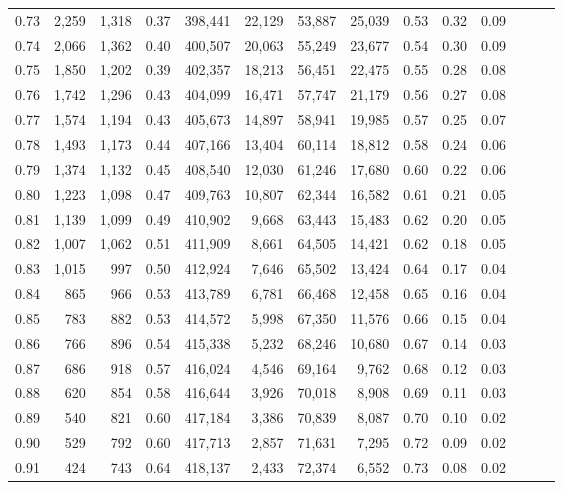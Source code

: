 \begin{tabular}{rrrrrrrrrrrrrr}
0.73 &  2,259 &  1,318 &  0.37 &  398,441 &   22,129 &  53,887 &  25,039 &  0.53 &  0.32 &      0.09 \\
0.74 &  2,066 &  1,362 &  0.40 &  400,507 &   20,063 &  55,249 &  23,677 &  0.54 &  0.30 &      0.09 \\
0.75 &  1,850 &  1,202 &  0.39 &  402,357 &   18,213 &  56,451 &  22,475 &  0.55 &  0.28 &      0.08 \\
0.76 &  1,742 &  1,296 &  0.43 &  404,099 &   16,471 &  57,747 &  21,179 &  0.56 &  0.27 &      0.08 \\
0.77 &  1,574 &  1,194 &  0.43 &  405,673 &   14,897 &  58,941 &  19,985 &  0.57 &  0.25 &      0.07 \\
0.78 &  1,493 &  1,173 &  0.44 &  407,166 &   13,404 &  60,114 &  18,812 &  0.58 &  0.24 &      0.06 \\
0.79 &  1,374 &  1,132 &  0.45 &  408,540 &   12,030 &  61,246 &  17,680 &  0.60 &  0.22 &      0.06 \\
0.80 &  1,223 &  1,098 &  0.47 &  409,763 &   10,807 &  62,344 &  16,582 &  0.61 &  0.21 &      0.05 \\
0.81 &  1,139 &  1,099 &  0.49 &  410,902 &    9,668 &  63,443 &  15,483 &  0.62 &  0.20 &      0.05 \\
0.82 &  1,007 &  1,062 &  0.51 &  411,909 &    8,661 &  64,505 &  14,421 &  0.62 &  0.18 &      0.05 \\
0.83 &  1,015 &    997 &  0.50 &  412,924 &    7,646 &  65,502 &  13,424 &  0.64 &  0.17 &      0.04 \\
0.84 &    865 &    966 &  0.53 &  413,789 &    6,781 &  66,468 &  12,458 &  0.65 &  0.16 &      0.04 \\
0.85 &    783 &    882 &  0.53 &  414,572 &    5,998 &  67,350 &  11,576 &  0.66 &  0.15 &      0.04 \\
0.86 &    766 &    896 &  0.54 &  415,338 &    5,232 &  68,246 &  10,680 &  0.67 &  0.14 &      0.03 \\
0.87 &    686 &    918 &  0.57 &  416,024 &    4,546 &  69,164 &   9,762 &  0.68 &  0.12 &      0.03 \\
0.88 &    620 &    854 &  0.58 &  416,644 &    3,926 &  70,018 &   8,908 &  0.69 &  0.11 &      0.03 \\
0.89 &    540 &    821 &  0.60 &  417,184 &    3,386 &  70,839 &   8,087 &  0.70 &  0.10 &      0.02 \\
0.90 &    529 &    792 &  0.60 &  417,713 &    2,857 &  71,631 &   7,295 &  0.72 &  0.09 &      0.02 \\
0.91 &    424 &    743 &  0.64 &  418,137 &    2,433 &  72,374 &   6,552 &  0.73 &  0.08 &      0.02 \\

\end{tabular}
